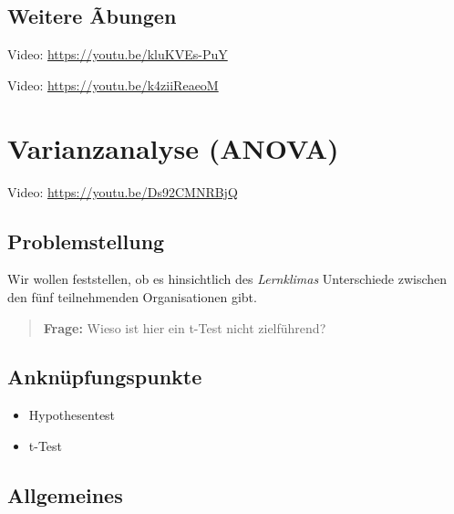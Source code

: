 \documentclass[
]{book}
\providecommand{\tightlist}{%
  \setlength{\itemsep}{0pt}\setlength{\parskip}{0pt}}
\begin{document}
\hypertarget{weitere-uxe3bungen}{%
\section{Weitere Ãbungen}\label{weitere-uxe3bungen}}

Video: \url{https://youtu.be/kluKVEs-PuY}

Video: \url{https://youtu.be/k4ziiReaeoM}

\hypertarget{varianzanalyse-anova}{%
\chapter{Varianzanalyse (ANOVA)}\label{varianzanalyse-anova}}

Video: \url{https://youtu.be/Ds92CMNRBjQ}

\hypertarget{problemstellung-3}{%
\section{Problemstellung}\label{problemstellung-3}}

Wir wollen feststellen, ob es hinsichtlich des \emph{Lernklimas} Unterschiede zwischen den fünf teilnehmenden Organisationen gibt.

\begin{quote}
\textbf{Frage:} Wieso ist hier ein t-Test nicht zielführend?
\end{quote}

\hypertarget{anknuxfcpfungspunkte-5}{%
\section{Anknüpfungspunkte}\label{anknuxfcpfungspunkte-5}}

\begin{itemize}
\tightlist
\item
  Hypothesentest
\item
  t-Test
\end{itemize}

\hypertarget{allgemeines-6}{%
\section{Allgemeines}\label{allgemeines-6}}
\end{document}
